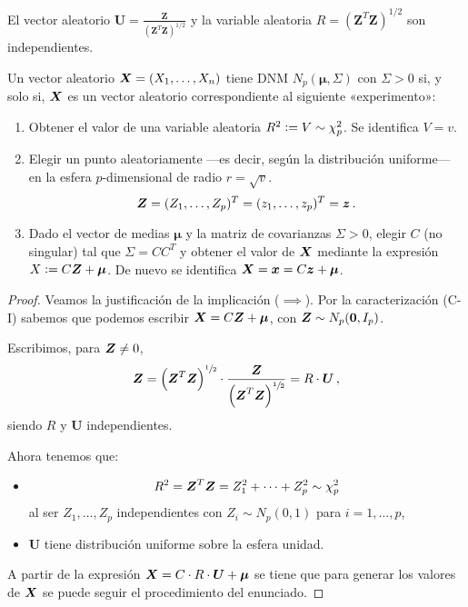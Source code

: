 \begin{nprop}
  El vector aleatorio $\boldsymbol U = \frac{\boldsymbol Z}{(\boldsymbol Z^T \boldsymbol Z)^{1/2}}$ y la variable aleatoria $R = (\boldsymbol Z^T \boldsymbol Z)^{1/2}$ son independientes.
\end{nprop}


\begin{nprop}
  Un vector aleatorio $\boldsymbol{X} = (X_1, \dots, X_n)$ tiene DNM $N_p(\boldsymbol \mu, \Sigma)$ con $\Sigma > 0$ si, y solo si, $\boldsymbol{X}$ es un vector aleatorio correspondiente al siguiente «experimento»:

  \begin{enumerate}
    \item Obtener el valor de una variable aleatoria $R^2 \vcentcolon= V \sim \chi_p^2$. Se identifica $V = v$.
    \item Elegir un punto aleatoriamente —es decir, según la distribución uniforme— en la esfera $p$-dimensional de radio $r = \sqrt{v}$. \[\boldsymbol{Z} = (Z_1, \dots, Z_p)^T = (z_1, \dots, z_p)^T = \boldsymbol z\,.\]
    \item Dado el vector de medias $\boldsymbol \mu$ y la matriz de covarianzas $\Sigma > 0$, elegir $C$ (no singular) tal que $\Sigma = CC^T$ y obtener el valor de $\boldsymbol{X}$ mediante la expresión $X\vcentcolon= C\boldsymbol{Z} + \boldsymbol \mu$. De nuevo se identifica $\boldsymbol{X} = \boldsymbol x = C\boldsymbol z + \boldsymbol \mu$.
  \end{enumerate}
\end{nprop}

\begin{proof}
  Veamos la justificación de la implicación ($\implies$). Por la caracterización (C-I) sabemos que podemos escribir $\boldsymbol{X} = C\boldsymbol{Z} + \boldsymbol \mu$, con $\boldsymbol{Z} \sim N_p(\boldsymbol 0, I_p)$.

  Escribimos, para $\boldsymbol{Z} \neq 0$, \[\boldsymbol{Z} = \left(\boldsymbol{Z}^T\boldsymbol{Z}\right)^{\sfrac{1}{2}} \cdot \frac{\boldsymbol{Z}}{\left(\boldsymbol{Z}^T\boldsymbol{Z}\right)^{\sfrac{1}{2}}} = R \cdot \boldsymbol U\,,\] siendo $R$ y $\boldsymbol U$ independientes.

  Ahora tenemos que: \begin{itemize}
    \item \[R^2 = \boldsymbol{Z}^T\boldsymbol{Z} = Z_1^2 + \cdots + Z_p^2 \sim \chi_p^2\]al ser $Z_1, \dots, Z_p$ independientes con $Z_i \sim N_p(0, 1)$ para $i = 1, \dots, p$,
    \item $\boldsymbol U$ tiene distribución uniforme sobre la esfera unidad.
  \end{itemize}

  A partir de la expresión $\boldsymbol{X} = C \cdot R \cdot \boldsymbol U + \boldsymbol \mu$ se tiene que para generar los valores de $\boldsymbol{X}$ se puede seguir el procedimiento del enunciado.
\end{proof}

